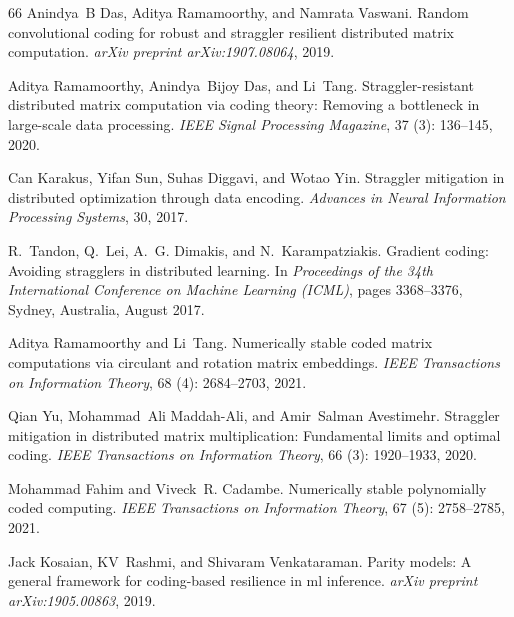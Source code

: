 \documentclass{article}
\begin{document}
\begin{thebibliography}{66}
Anindya~B Das, Aditya Ramamoorthy, and Namrata Vaswani.
\newblock Random convolutional coding for robust and straggler resilient distributed matrix computation.
\newblock \emph{arXiv preprint arXiv:1907.08064}, 2019.

Aditya Ramamoorthy, Anindya~Bijoy Das, and Li~Tang.
\newblock Straggler-resistant distributed matrix computation via coding theory: Removing a bottleneck in large-scale data processing.
\newblock \emph{IEEE Signal Processing Magazine}, 37 (3): 136--145, 2020.

Can Karakus, Yifan Sun, Suhas Diggavi, and Wotao Yin.
\newblock Straggler mitigation in distributed optimization through data encoding.
\newblock \emph{Advances in Neural Information Processing Systems}, 30, 2017.

R.~Tandon, Q.~Lei, A.~G. Dimakis, and N.~Karampatziakis.
\newblock Gradient coding: Avoiding stragglers in distributed learning.
\newblock In \emph{Proceedings of the 34th International Conference on Machine Learning (ICML)}, pages 3368--3376, Sydney, Australia, August 2017.

Aditya Ramamoorthy and Li~Tang.
\newblock Numerically stable coded matrix computations via circulant and rotation matrix embeddings.
\newblock \emph{IEEE Transactions on Information Theory}, 68 (4): 2684--2703, 2021.

Qian Yu, Mohammad~Ali Maddah-Ali, and Amir~Salman Avestimehr.
\newblock Straggler mitigation in distributed matrix multiplication: Fundamental limits and optimal coding.
\newblock \emph{IEEE Transactions on Information Theory}, 66 (3): 1920--1933, 2020{}.

Mohammad Fahim and Viveck~R. Cadambe.
\newblock Numerically stable polynomially coded computing.
\newblock \emph{IEEE Transactions on Information Theory}, 67 (5): 2758--2785, 2021{}.

Jack Kosaian, KV~Rashmi, and Shivaram Venkataraman.
\newblock Parity models: A general framework for coding-based resilience in ml inference.
\newblock \emph{arXiv preprint arXiv:1905.00863}, 2019.


\end{thebibliography}
\end{document}
